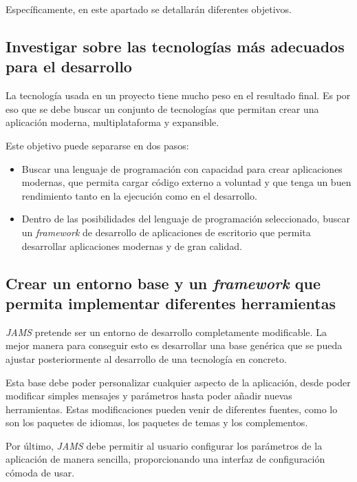 \noindent Específicamente, en este apartado se detallarán diferentes objetivos.

\subsection{Investigar sobre las tecnologías más adecuados para el desarrollo}
\label{subsec:investigar-sobre-las-tecnologias-mas-adecuados-para-el-desarrollo}

La tecnología usada en un proyecto tiene mucho peso en el resultado final.
Es por eso que se debe buscar un conjunto de tecnologías que permitan crear una aplicación
moderna, multiplataforma y expansible.

\noindent Este objetivo puede separarse en dos pasos:
\begin{itemize}
    \item Buscar una lenguaje de programación con capacidad para crear aplicaciones modernas,
    que permita cargar código externo a voluntad y que tenga un buen rendimiento
    tanto en la ejecución como en el desarrollo.
    \item Dentro de las posibilidades del lenguaje de programación seleccionado,
    buscar un \textit{framework} de desarrollo de aplicaciones de escritorio
    que permita desarrollar aplicaciones modernas y de gran calidad.
\end{itemize}

\subsection{Crear un entorno base y un \textit{framework} que permita implementar diferentes herramientas}
\label{subsec:crear-un-entorno-base-y-un-framework-que-permita-implementar-diferentes-herramientas}

\textit{JAMS} pretende ser un entorno de desarrollo completamente modificable.
La mejor manera para conseguir esto es desarrollar una base genérica
que se pueda ajustar posteriormente al desarrollo de una tecnología en concreto.

\noindent Esta base debe poder personalizar cualquier aspecto de la aplicación,
desde poder modificar simples mensajes y parámetros hasta poder
añadir nuevas herramientas.
Estas modificaciones pueden venir de diferentes fuentes, como lo son
los paquetes de idiomas, los paquetes de temas y los complementos.

\noindent Por último, \textit{JAMS} debe permitir al usuario configurar los parámetros
de la aplicación de manera sencilla, proporcionando una interfaz de configuración
cómoda de usar.

